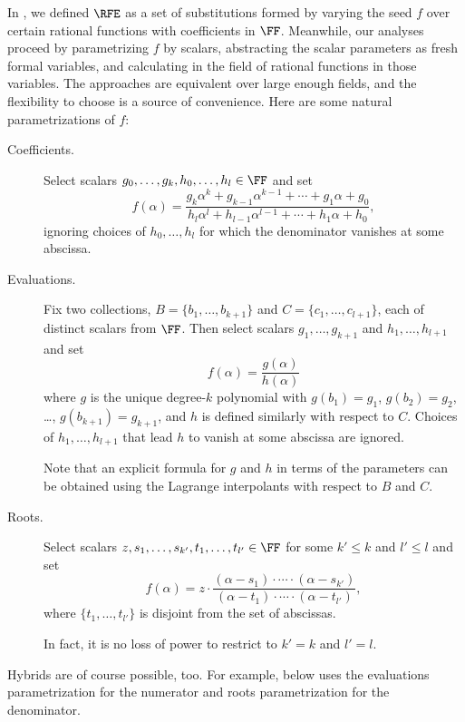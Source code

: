 \documentclass{toc}
\begin{document}
In ,
we defined \(\RFE\) as a set of substitutions formed by varying the seed \(f\)
over certain rational functions with coefficients in \(\FF\).
Meanwhile,
our analyses proceed by parametrizing \(f\) by scalars,
abstracting the scalar parameters as fresh formal variables,
and calculating in the field of rational functions in those variables.
The approaches are equivalent over large enough fields, 
and the flexibility to choose is a source of convenience.
Here are some natural parametrizations of \(f\):
\begin{description}
  \item[Coefficients.]
    Select scalars \(g_0, \ldots, g_k, h_0,\ldots, h_l \in\FF\) and
    set
    \[
      f(\alpha) =
        \frac{
          g_k\alpha^k
          + g_{k-1} \alpha^{k-1}
          + \cdots
          + g_1 \alpha
          + g_0
        }{
          h_l\alpha^l
          + h_{l-1} \alpha^{l-1}
          + \cdots
          + h_1 \alpha
          + h_0
      },
    \]
    ignoring choices of \(h_0,\ldots,h_l\) for which the denominator
    vanishes at some abscissa.

  \item[Evaluations.]
    Fix two collections, \(B = \{b_1,\ldots,b_{k+1}\}\) and
    \(C = \{c_1,\ldots,c_{l+1}\}\), each of distinct scalars from \(\FF\).
    Then select scalars \(g_1, \ldots, g_{k+1}\) and \(h_1,\ldots,h_{l+1}\)
    and set
    \[
      f(\alpha) = \frac{ g(\alpha) }{ h(\alpha) }
    \]
    where \(g\) is the unique degree-\(k\) polynomial with
    \(g(b_1)=g_1\), \(g(b_2)=g_2\), \ldots, \(g(b_{k+1}) = g_{k+1}\),
    and \(h\) is defined similarly with respect to \(C\).
    Choices of \(h_1,\ldots,h_{l+1}\) that lead \(h\) to vanish at some
    abscissa are ignored.

    Note that an explicit formula for \(g\) and \(h\) in terms of the
    parameters can be obtained using the Lagrange interpolants with
    respect to \(B\) and \(C\).

  \item[Roots.]
    Select scalars \(z, s_1,\ldots,s_{k'}, t_1,\ldots,t_{l'} \in \FF\)
    for some \(k' \le k\) and \(l'\le l\) and set
    \[
      f(\alpha) = z \cdot
        \frac{ (\alpha - s_1) \cdot \cdots \cdot (\alpha - s_{k'}) }%
             { (\alpha - t_1) \cdot \cdots \cdot (\alpha - t_{l'}) },
    \]
    where \(\{t_1,\ldots,t_{l'}\}\) is disjoint from the set of abscissas.

    In fact, it is no loss of power to restrict to \(k'=k\) and
    \(l'=l\).
\end{description}
Hybrids are of course possible, too.
For example,  below uses the evaluations
parametrization for the numerator and roots parametrization for the
denominator.
\end{document}
